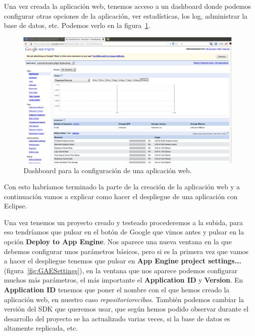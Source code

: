 Una vez creada la aplicación web, tenemos acceso a un dashboard donde podemos configurar otras opciones de la aplicación, ver estadísticas, los log, administrar la base de datos, etc. Podemos verlo en la figura~\ref{fig:dashboardGAE}.

\begin{figure}[hbt]
  \centering
    \includegraphics[scale=0.4]{./AnexoConfiguracionEclipse/imagenes/dashboardGAE.png}
  \caption{Dashboard para la configuración de una aplicación web.}
  \label{fig:dashboardGAE}
\end{figure}

Con esto habríamos terminado la parte de la creación de la aplicación web y a continuación vamos a explicar como hacer el despliegue de una aplicación con Eclipse.

Una vez tenemos un proyecto creado y testeado procederemos a la subida, para eso tendríamos que pulsar en el botón de Google que vimos antes y pulsar en la opción \textbf{Deploy to App Engine}. Nos aparece una nueva ventana en la que debemos configurar unos parámetros básicos, pero si es la primera vez que vamos a hacer el despliegue tenemos que pulsar en \textbf{App Engine project settings...} (figura~\ref{fig:GAESettings}), en la ventana que nos aparece podemos configurar muchos más parámetros, el más importante el \textbf{Application ID} y \textbf{Version}. En \textbf{Application ID} tenemos que poner el nombre con el que hemos creado la aplicación web, en nuestro caso \textit{repositoriorecibos}. También podemos cambiar la versión del SDK que queremos usar, que según hemos podido observar durante el desarrollo del proyecto se ha actualizado varias veces, si la base de datos es altamente replicada, etc.

